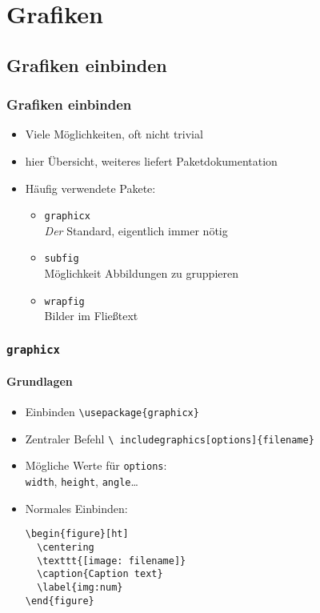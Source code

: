 \section{Grafiken}

\subsection{Grafiken einbinden}

\begin{frame}
  \frametitle{Grafiken einbinden}
  \begin{itemize}
  \item Viele Möglichkeiten, oft nicht trivial
  \item hier Übersicht, weiteres liefert Paketdokumentation
  \item Häufig verwendete Pakete:
    \begin{itemize}
    \item \texttt{graphicx}\\
      \emph{Der} Standard, eigentlich immer nötig
    \item \texttt{subfig}\\
      Möglichkeit Abbildungen zu gruppieren
    \item \texttt{wrapfig}\\
      Bilder im Fließtext
    \end{itemize}
  \end{itemize}
\end{frame}

\begin{frame}[fragile]
  \frametitle{\texttt{graphicx}}
  \framesubtitle{Grundlagen}
  \begin{itemize}
  \item Einbinden \texttt{\textbackslash usepackage\{graphicx\}}
  \item Zentraler Befehl \texttt{\textbackslash
      includegraphics[options]\{filename\}}
  \item Mögliche Werte für \texttt{options}:\\
    \texttt{width}, \texttt{height}, \texttt{angle}\dots
  \item Normales Einbinden:
\begin{lstlisting}[language={[LaTeX]TeX}]
\begin{figure}[ht]
  \centering
  \texttt{[image: filename]}
  \caption{Caption text}
  \label{img:num}
\end{figure}
\end{lstlisting}
  \end{itemize}
\end{frame}

